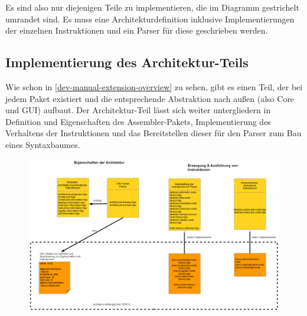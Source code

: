 Es sind also nur diejenigen Teile zu implementieren, die im Diagramm gestrichelt umrandet sind. Es muss eine Architekturdefinition inklusive Implementierungen der einzelnen Instruktionen und ein Parser für diese geschrieben werden.

\subsection{Implementierung des Architektur-Teils}
Wie schon in \autoref{dev-manual-extension-overview} zu sehen, gibt es einen Teil, der bei jedem Paket existiert und die entsprechende Abstraktion nach außen (also Core und GUI) aufbaut. Der Architektur-Teil lässt sich weiter untergliedern in Definition und Eigenschaften des Assembler-Pakets, Implementierung des Verhaltens der Instruktionen und das Bereitstellen dieser für den Parser zum Bau eines Syntaxbaumes.
\begin{figure}[ht]
	\centering
	\includegraphics[scale=0.45]{charts/extension-arch.png}
\end{figure}

